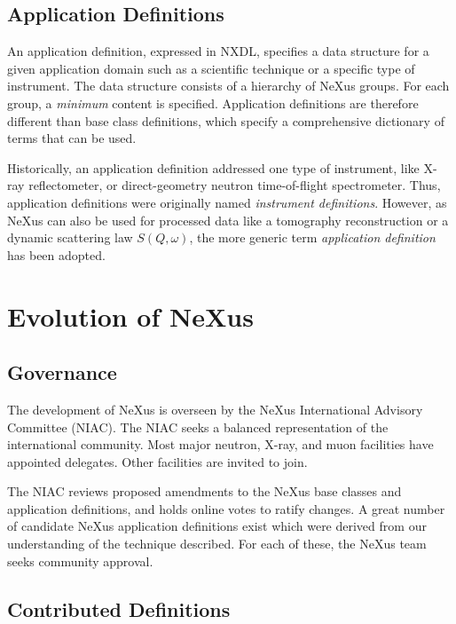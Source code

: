 \documentclass[%
 aip,
rsi,
 amsmath,amssymb,
 reprint,%
]{revtex4-1}
\begin{document}
\subsection{Application Definitions}
  \label{sect_appdef}

An application definition, expressed in NXDL, specifies a data structure
for a given application domain such as a scientific technique or a specific type of instrument.
The data structure consists of a hierarchy of NeXus groups.
For each group, a \emph{minimum} content is specified.
Application definitions are therefore different than
base class definitions, which specify a comprehensive 
dictionary of terms that can be used.

Historically, an application definition addressed one type of instrument,
like X-ray reflectometer, or direct-geometry neutron time-of-flight spectrometer.
Thus, application definitions were originally named \emph{instrument definitions}.
However, as NeXus can also be used for processed data
like a tomography reconstruction or a dynamic scattering law $S(Q,\omega)$, 
the more generic term \emph{application definition} has been adopted.


\section{Evolution of NeXus}

\subsection{Governance}
  \label{sect_gov}

The development of NeXus is overseen
by the NeXus International Advisory Committee (NIAC)\cite{niac}.
The NIAC seeks a balanced representation of the international community.
Most major neutron, X-ray, and muon facilities have appointed delegates.
Other facilities are invited to join.

The NIAC reviews proposed amendments to the NeXus base classes and
application definitions, and holds online votes to ratify changes.
A great number of candidate NeXus application definitions exist which were derived from our understanding of the technique described.
For each of these, the NeXus team seeks community approval. 

\subsection{Contributed Definitions}
  \label{sect_contribdef}
\end{document}
